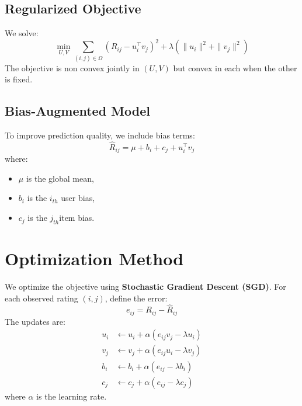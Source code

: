\documentclass[10pt,twocolumn]{article}
\begin{document}
\subsection{Regularized Objective}
We solve:
\begin{equation}
\min_{U,V}
\sum_{(i,j)\in\Omega}
\left( R_{ij} - u_i^\top v_j \right)^2
+
\lambda \left( \|u_i\|^2 + \|v_j\|^2 \right)
\end{equation}
The objective is non convex jointly in $(U,V)$ but convex in each when the other is fixed.

\subsection{Bias-Augmented Model}
To improve prediction quality, we include bias terms:
\begin{equation}
\hat{R}_{ij} = \mu + b_i + c_j + u_i^\top v_j
\end{equation}
where:                            %
\begin{itemize}
    \item $\mu$ is the global mean,
    \item $b_i$ is the $i_{th}$ user bias,
    \item $c_j$ is the $j_{th}$item bias.
\end{itemize}

\section{Optimization Method}
We optimize the objective using \textbf{Stochastic Gradient Descent (SGD)}.
For each observed rating $(i,j)$, define the error:
\begin{equation}
e_{ij} = R_{ij} - \hat{R}_{ij}
\end{equation}
The updates are:
\begin{align}
u_i &\leftarrow u_i + \alpha ( e_{ij} v_j - \lambda u_i )\\
v_j &\leftarrow v_j + \alpha ( e_{ij} u_i - \lambda v_j )\\
b_i &\leftarrow b_i + \alpha ( e_{ij} - \lambda b_i )\\
c_j &\leftarrow c_j + \alpha ( e_{ij} - \lambda c_j )
\end{align}
where $\alpha$ is the learning rate.

\end{document}
